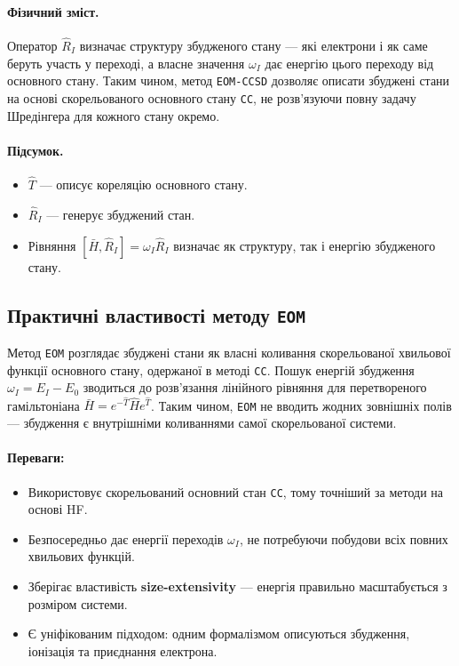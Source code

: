 \paragraph{Фізичний зміст.}
Оператор \(\hat{R}_I\) визначає структуру збудженого стану —
які електрони і як саме беруть участь у переході,
а власне значення \(\omega_I\) дає енергію цього переходу від основного стану.
Таким чином, метод \texttt{EOM-CCSD} дозволяє описати збуджені стани
на основі скорельованого основного стану \texttt{CC},
не розв’язуючи повну задачу Шредінгера для кожного стану окремо.

\paragraph{Підсумок.}
\begin{itemize}
    \item \(\hat{T}\) --- описує кореляцію основного стану.
    \item \(\hat{R}_I\) --- генерує збуджений стан.
    \item Рівняння \([\bar{H}, \hat{R}_I] = \omega_I \hat{R}_I\)
          визначає як структуру, так і енергію збудженого стану.
\end{itemize}


\subsection{Практичні властивості методу \texttt{EOM}}

Метод \texttt{EOM} розглядає збуджені стани як
власні коливання скорельованої хвильової функції основного стану,
одержаної в методі \texttt{CC}.
Пошук енергій збудження \(\omega_I = E_I - E_0\)
зводиться до розв’язання лінійного рівняння для
перетвореного гамільтоніана \(\bar{H} = e^{-\hat{T}}\hat{H}e^{\hat{T}}\).
Таким чином, \texttt{EOM} не вводить жодних зовнішніх полів —
збудження є внутрішніми коливаннями самої скорельованої системи.

\paragraph{Переваги:}
\begin{itemize}
    \item Використовує скорельований основний стан \texttt{CC}, тому точніший за методи на основі HF.
    \item Безпосередньо дає енергії переходів \(\omega_I\), не потребуючи побудови всіх повних хвильових функцій.
    \item Зберігає властивість \textbf{size-extensivity} --- енергія правильно масштабується з розміром системи.
    \item Є уніфікованим підходом: одним формалізмом описуються збудження, іонізація та приєднання електрона.
\end{itemize}

